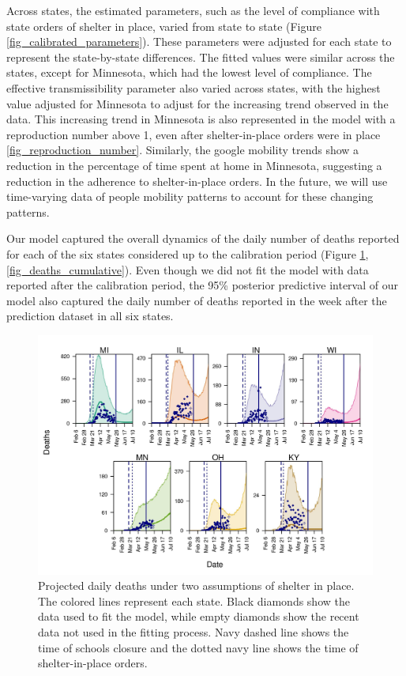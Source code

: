 \documentclass[11pt]{article}
\begin{document}
Across states, the estimated parameters, such as the level of compliance with state orders of shelter in place, varied from state to state (Figure \ref{fig_calibrated_parameters}). These parameters were adjusted for each state to represent the state-by-state differences. The fitted values were similar across the states, except for Minnesota, which had the lowest level of compliance. The effective transmissibility parameter also varied across states, with the highest value adjusted for Minnesota to adjust for the increasing trend observed in the data. This increasing trend in Minnesota is also represented in the model with a reproduction number above 1, even after shelter-in-place orders were in place \ref{fig_reproduction_number}. Similarly, the google mobility trends show a reduction in the percentage of time spent at home in Minnesota, suggesting a reduction in the adherence to shelter-in-place orders. In the future, we will use time-varying data of people mobility patterns to account for these changing patterns. 

Our model captured the overall dynamics of the daily number of deaths reported for each of the six states considered up to the calibration period (Figure \ref{fig_deaths_forecast},\ref{fig_deaths_cumulative}). Even though we did not fit the model with data reported after the calibration period, the 95\% posterior predictive interval of our model also captured the daily number of deaths reported in the week after the prediction dataset in all six states.


\begin{figure}[hb!]
\centering
\includegraphics[width=\textwidth]{../figures/report_figure_deaths_forecast.jpeg} 
\caption{\label{fig_deaths_forecast} Projected daily deaths under two assumptions of shelter in place. The colored lines represent each state. Black diamonds show the data used to fit the model, while empty diamonds show the recent data not used in the fitting process. Navy dashed line shows the time of schools closure and the dotted navy line shows the time of shelter-in-place orders.}
\end{figure}
\end{document}
